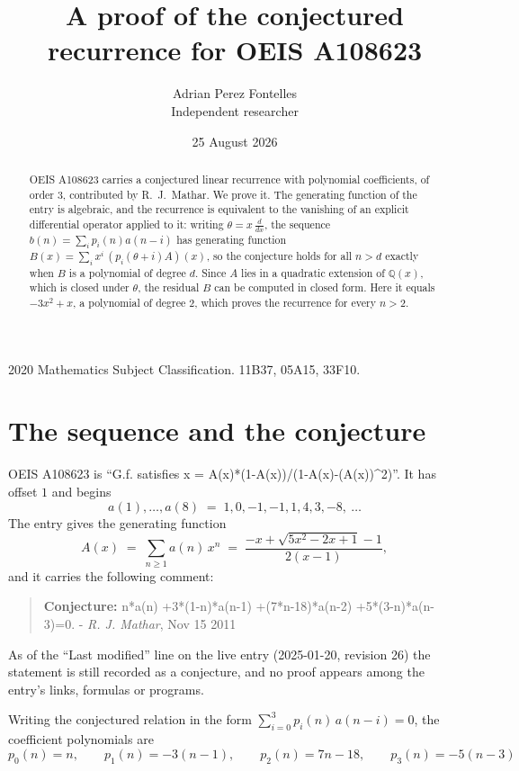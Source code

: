\documentclass[11pt,a4paper]{article}
\title{A proof of the conjectured recurrence for OEIS A108623}
\author{Adrian Perez Fontelles\\ \small Independent researcher}
\date{25 August 2026}
\theoremstyle{plain}
\theoremstyle{definition}
\begin{document}
\maketitle

\begin{abstract}
OEIS A108623 carries a conjectured linear recurrence with polynomial coefficients, of
order 3, contributed by R.~J.~Mathar. We prove it. The generating function of the
entry is algebraic, and the recurrence is equivalent to the vanishing of an explicit
differential operator applied to it: writing $\theta=x\,\frac{d}{dx}$, the sequence
$b(n)=\sum_{i}p_{i}(n)a(n-i)$ has generating function
$B(x)=\sum_{i}x^{i}\,(p_{i}(\theta+i)A)(x)$, so the conjecture holds for all $n>d$ exactly
when $B$ is a polynomial of degree $d$. Since $A$ lies in a quadratic extension of
$\mathbb{Q}(x)$, which is closed under $\theta$, the residual $B$ can be computed in
closed form. Here it equals $- 3 x^{2} + x$, a polynomial of degree $2$, which proves
the recurrence for every $n>2$.
\end{abstract}

\noindent\small 2020 Mathematics Subject Classification. 11B37, 05A15, 33F10.\normalsize

\section{The sequence and the conjecture}

OEIS A108623 is ``G.f. satisfies x = A(x)*(1-A(x))/(1-A(x)-(A(x))\^{}2)''. It has offset $1$ and begins
\[
a(1),\dots,a(8)\;=\;1, 0, -1, -1, 1, 4, 3, -8,\ \dots
\]
The entry gives the generating function
\begin{equation}\label{eq:gf}
A(x)\;=\;\sum_{n\ge 1} a(n)\,x^{n}\;=\;\frac{- x + \sqrt{5 x^{2} - 2 x + 1} - 1}{2 \left(x - 1\right)} ,
\end{equation}
and it carries the following comment:
\begin{quote}\small
\textbf{Conjecture:} n*a(n) +3*(1-n)*a(n-1) +(7*n-18)*a(n-2) +5*(3-n)*a(n-3)=0. - \emph{R. J. Mathar}, Nov 15 2011
\end{quote}
As of the ``Last modified'' line on the live entry (2025-01-20, revision 26) the
statement is still recorded as a conjecture, and no proof appears among the entry's links,
formulas or programs.

Writing the conjectured relation in the form $\sum_{i=0}^{3}p_{i}(n)\,a(n-i)=0$,
the coefficient polynomials are
\[
p_{0}(n)=n,\qquad p_{1}(n)=- 3 \left(n - 1\right),\qquad p_{2}(n)=7 n - 18,\qquad p_{3}(n)=- 5 \left(n - 3\right)
\]
\end{document}

